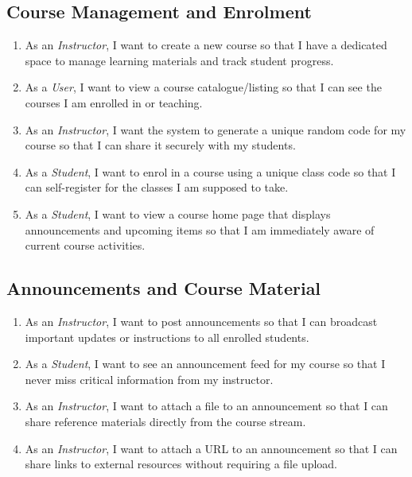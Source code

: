 \documentclass[12pt, a4paper]{article}
\begin{document}
\subsection{Course Management and Enrolment}
\begin{enumerate}[label=\textbf{US\,\arabic*}, start=5]
  \item As an \emph{Instructor}, I want to create a new course so that I have
        a dedicated space to manage learning materials and track student
        progress.
  \item As a \emph{User}, I want to view a course catalogue/listing so that I
        can see the courses I am enrolled in or teaching.
  \item As an \emph{Instructor}, I want the system to generate a unique random
        code for my course so that I can share it securely with my students.
  \item As a \emph{Student}, I want to enrol in a course using a unique class
        code so that I can self-register for the classes I am supposed to take.
  \item As a \emph{Student}, I want to view a course home page that displays
        announcements and upcoming items so that I am immediately aware of
        current course activities.
\end{enumerate}

\subsection{Announcements and Course Material}
\begin{enumerate}[label=\textbf{US\,\arabic*}, start=10]
  \item As an \emph{Instructor}, I want to post announcements so that I can
        broadcast important updates or instructions to all enrolled students.
  \item As a \emph{Student}, I want to see an announcement feed for my course
        so that I never miss critical information from my instructor.
  \item As an \emph{Instructor}, I want to attach a file to an announcement so
        that I can share reference materials directly from the course stream.
  \item As an \emph{Instructor}, I want to attach a URL to an announcement so
        that I can share links to external resources without requiring a file
        upload.
\end{enumerate}
\end{document}
